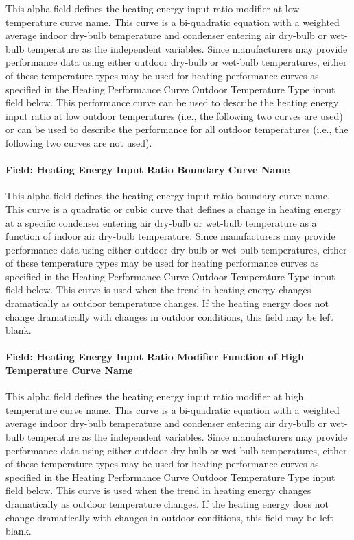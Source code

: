 This alpha field defines the heating energy input ratio modifier at low temperature curve name. This curve is a bi-quadratic equation with a weighted average indoor dry-bulb temperature and condenser entering air dry-bulb or wet-bulb temperature as the independent variables. Since manufacturers may provide performance data using either outdoor dry-bulb or wet-bulb temperatures, either of these temperature types may be used for heating performance curves as specified in the Heating Performance Curve Outdoor Temperature Type input field below. This performance curve can be used to describe the heating energy input ratio at low outdoor temperatures (i.e., the following two curves are used) or can be used to describe the performance for all outdoor temperatures (i.e., the following two curves are not used).

\paragraph{Field: Heating Energy Input Ratio Boundary Curve Name}\label{field-heating-energy-input-ratio-boundary-curve-name}

This alpha field defines the heating energy input ratio boundary curve name. This curve is a quadratic or cubic curve that defines a change in heating energy at a specific condenser entering air dry-bulb or wet-bulb temperature as a function of indoor air dry-bulb temperature. Since manufacturers may provide performance data using either outdoor dry-bulb or wet-bulb temperatures, either of these temperature types may be used for heating performance curves as specified in the Heating Performance Curve Outdoor Temperature Type input field below. This curve is used when the trend in heating energy changes dramatically as outdoor temperature changes. If the heating energy does not change dramatically with changes in outdoor conditions, this field may be left blank.

\paragraph{Field: Heating Energy Input Ratio Modifier Function of High Temperature Curve Name}\label{field-heating-energy-input-ratio-modifier-function-of-high-temperature-curve-name}

This alpha field defines the heating energy input ratio modifier at high temperature curve name. This curve is a bi-quadratic equation with a weighted average indoor dry-bulb temperature and condenser entering air dry-bulb or wet-bulb temperature as the independent variables. Since manufacturers may provide performance data using either outdoor dry-bulb or wet-bulb temperatures, either of these temperature types may be used for heating performance curves as specified in the Heating Performance Curve Outdoor Temperature Type input field below. This curve is used when the trend in heating energy changes dramatically as outdoor temperature changes. If the heating energy does not change dramatically with changes in outdoor conditions, this field may be left blank.

